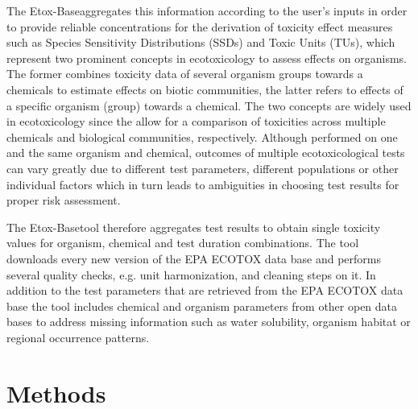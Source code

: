 \documentclass[english]{article}
\newcommand{\etoxbase}{Etox-Base}
\newcommand{\epa}{EPA ECOTOX data base}
\begin{document}
The \etoxbase aggregates this information according to the user's inputs in order to provide reliable concentrations for the derivation of toxicity effect measures such as Species Sensitivity Distributions (SSDs) \citep{posthuma_species_2002} and Toxic Units (TUs), which represent two prominent concepts in ecotoxicology to assess effects on organisms. The former combines toxicity data of several organism groups towards a chemicals to estimate effects on biotic communities, the latter refers to effects of a specific organism (group) towards a chemical. The two concepts are widely used in ecotoxicology \citep{kefford_definition_2011, schafer_effects_2011} since the allow for a comparison of toxicities across multiple chemicals and biological communities, respectively. Although performed on one and the same organism and chemical, outcomes of multiple ecotoxicological tests can vary greatly due to different test parameters, different populations or other individual factors which in turn leads to ambiguities in choosing test results for proper risk assessment.

The \etoxbase tool therefore aggregates test results to obtain single toxicity values for organism, chemical and test duration combinations. The tool downloads every new version of the \epa{} and performs several quality checks, e.g. unit harmonization, and cleaning steps on it. In addition to the test parameters that are retrieved from the \epa{} the tool includes chemical and organism parameters from other open data bases to address missing information such as water solubility, organism habitat or regional occurrence patterns. 

\section*{Methods}

\end{document}

